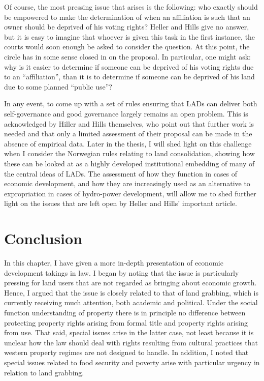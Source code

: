 Of course, the most pressing issue that arises is the following: who exactly should be empowered to make the determination of when an affiliation is such that an owner should be deprived of his voting rights? Heller and Hills give no answer, but it is easy to imagine that whoever is given this task in the first instance, the courts would soon enough be asked to consider the question. At this point, the circle has in some sense closed in on the proposal. In particular, one might ask: why is it easier to determine if someone can be deprived of his voting rights due to an ``affiliation'', than it is to determine if someone can be deprived of his land due to some planned ``public use''?

In any event, to come up with a set of rules ensuring that LADs can deliver both self-governance and good governance largely remains an open problem. This is acknowledged by Hiller and Hills themselves, who point out that further work is needed and that only a limited assessment of their proposal can be made in the absence of empirical data. Later in the thesis, I will shed light on this challenge when I consider the Norwegian rules relating to land consolidation, showing how these can be looked at as a highly developed institutional embedding of many of the central ideas of LADs. The assessment of how they function in cases of economic development, and how they are increasingly used as an alternative to expropriation in cases of hydro-power development, will allow me to shed further light on the issues that are left open by Heller and Hills' important article.

\section{Conclusion}\label{sec:conc2}

In this chapter, I have given a more in-depth presentation of economic development takings in law. I began by noting that the issue is particularly pressing for land users that are not regarded as bringing about economic growth. Hence, I argued that the issue is closely related to that of land grabbing, which is currently receiving much attention, both academic and political. Under the social function understanding of property there is in principle no difference between protecting property rights arising from formal title and property rights arising from use. That said, special issues arise in the latter case, not least because it is unclear how the law should deal with rights resulting from cultural practices that western property regimes are not designed to handle. In addition, I noted that special issues related to food security and poverty arise with particular urgency in relation to land grabbing.

